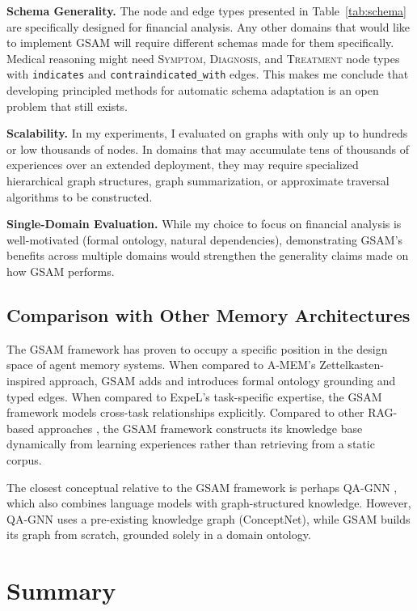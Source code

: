 \documentclass[12pt,a4paper,oneside]{article}
\begin{document}
\textbf{Schema Generality.} The node and edge types presented in Table~\ref{tab:schema} are specifically designed for financial analysis. Any other domains that would like to implement GSAM will require different schemas made for them specifically. Medical reasoning might need \textsc{Symptom}, \textsc{Diagnosis}, and \textsc{Treatment} node types with \texttt{indicates} and \texttt{contraindicated\_with} edges. This makes me conclude that developing principled methods for automatic schema adaptation is an open problem that still exists.

\textbf{Scalability.} In my experiments, I evaluated on graphs with only up to hundreds or low thousands of nodes. In domains that may accumulate tens of thousands of experiences over an extended deployment, they may require specialized hierarchical graph structures, graph summarization, or approximate traversal algorithms to be constructed.

\textbf{Single-Domain Evaluation.} While my choice to focus on financial analysis is well-motivated (formal ontology, natural dependencies), demonstrating GSAM's benefits across multiple domains would strengthen the generality claims made on how GSAM performs.

\subsection{Comparison with Other Memory Architectures}

The GSAM framework has proven to occupy a specific position in the design space of agent memory systems. When compared to A-MEM's \citep{xu2025amem} Zettelkasten-inspired approach, GSAM adds and introduces formal ontology grounding and typed edges. When compared to ExpeL's \citep{zhao2024expel} task-specific expertise, the GSAM framework models cross-task relationships explicitly. Compared to other RAG-based approaches \citep{lewis2020retrieval}, the GSAM framework constructs its knowledge base dynamically from learning experiences rather than retrieving from a static corpus.

The closest conceptual relative to the GSAM framework is perhaps QA-GNN \citep{yasunaga2021qagnn}, which also combines language models with graph-structured knowledge. However, QA-GNN uses a pre-existing knowledge graph (ConceptNet), while GSAM builds its graph from scratch, grounded solely in a domain ontology.

\section{Summary}
\label{sec:summary}
\end{document}
